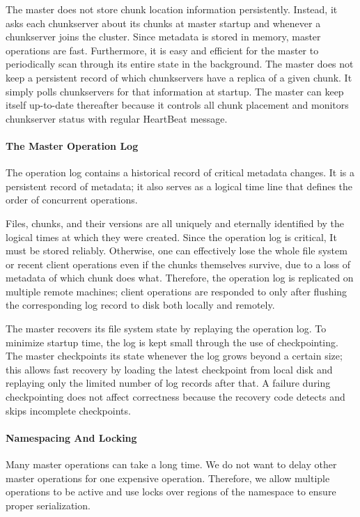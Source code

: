 \documentclass{article}
\begin{document}
The master does not store chunk location information persistently. Instead, it asks each chunkserver about its chunks at master startup and whenever a chunkserver joins the cluster.  Since metadata is stored in memory, master operations are fast. Furthermore, it is easy and efficient for the master to periodically scan through its entire state in the background. The master does not keep a persistent record of which chunkservers have a replica of a given chunk. It simply polls chunkservers for that information at startup. The master can keep itself up-to-date thereafter because it controls all chunk placement and monitors chunkserver status with regular HeartBeat message.

\paragraph{The Master Operation Log}
The operation log contains a historical record of critical metadata changes. It is a persistent record of metadata; it also serves as a logical time line  that defines the order of concurrent operations. 

Files, chunks, and their versions are all uniquely and eternally identified by the logical times at which they were created.  Since the operation log is critical, It must be stored reliably. Otherwise, one can  effectively lose the whole file system or recent client operations even if the chunks themselves survive, due to a loss of metadata of which chunk does what.  Therefore, the operation log is replicated on multiple remote machines; client operations are responded to only after flushing the corresponding log record to disk both locally and remotely.

The master recovers its file system state by replaying the operation log. To minimize startup time, the log is kept small through the use of checkpointing. The master checkpoints its state whenever the log grows beyond a certain size; this allows fast recovery by loading the latest checkpoint from local disk and replaying only the limited number of log records after that. A failure during checkpointing does not affect correctness because the recovery code detects and skips incomplete checkpoints.

\paragraph{Namespacing And Locking}
Many master operations can take a long time. We do not want to delay other master operations for one expensive operation. Therefore, we allow multiple
operations to be active and use locks over regions of the namespace to ensure
proper serialization.
\end{document}
